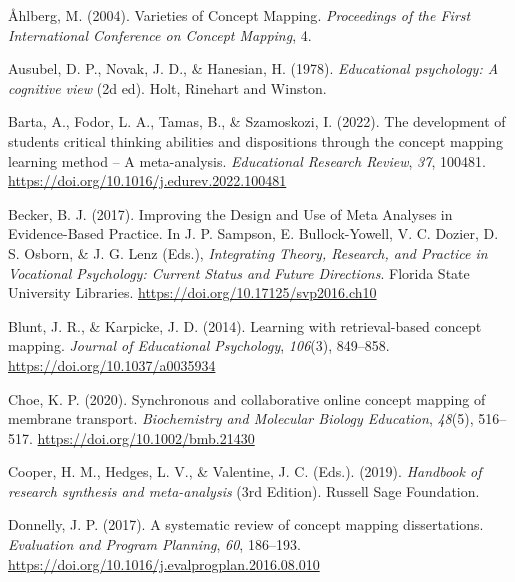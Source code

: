 \documentclass[
  letterpaper,
  DIV=11,
  numbers=noendperiod]{scrartcl}
\newlength{\cslhangindent}
\newlength{\cslentryspacingunit} %
\newenvironment{CSLReferences}[2] %
 {%
  \setlength{\parindent}{0pt}
  \ifodd #1
  \let\oldpar\par
  \def\par{\hangindent=\cslhangindent\oldpar}
  \fi
  \setlength{\parskip}{#2\cslentryspacingunit}
 }%
 {}
\begin{document}
\hypertarget{refs}{}
\begin{CSLReferences}{1}{0}
\leavevmode{}%
Åhlberg, M. (2004). Varieties of {Concept Mapping}. \emph{Proceedings of
the First International Conference on Concept Mapping}, 4.

\leavevmode{}%
Ausubel, D. P., Novak, J. D., \& Hanesian, H. (1978). \emph{Educational
psychology: A cognitive view} (2d ed). {Holt, Rinehart and Winston}.

\leavevmode{}%
Barta, A., Fodor, L. A., Tamas, B., \& Szamoskozi, I. (2022). The
development of students critical thinking abilities and dispositions
through the concept mapping learning method -- {A} meta-analysis.
\emph{Educational Research Review}, \emph{37}, 100481.
\url{https://doi.org/10.1016/j.edurev.2022.100481}

\leavevmode{}%
Becker, B. J. (2017). Improving the {Design} and {Use} of {Meta
Analyses} in {Evidence-Based Practice}. In J. P. Sampson, E.
Bullock-Yowell, V. C. Dozier, D. S. Osborn, \& J. G. Lenz (Eds.),
\emph{Integrating {Theory}, {Research}, and {Practice} in {Vocational
Psychology}: {Current Status} and {Future Directions}}. {Florida State
University Libraries}. \url{https://doi.org/10.17125/svp2016.ch10}

\leavevmode{}%
Blunt, J. R., \& Karpicke, J. D. (2014). Learning with retrieval-based
concept mapping. \emph{Journal of Educational Psychology},
\emph{106}(3), 849--858. \url{https://doi.org/10.1037/a0035934}

\leavevmode{}%
Choe, K. P. (2020). Synchronous and collaborative online concept mapping
of membrane transport. \emph{Biochemistry and Molecular Biology
Education}, \emph{48}(5), 516--517.
\url{https://doi.org/10.1002/bmb.21430}

\leavevmode{}%
Cooper, H. M., Hedges, L. V., \& Valentine, J. C. (Eds.). (2019).
\emph{Handbook of research synthesis and meta-analysis} (3rd Edition).
{Russell Sage Foundation}.

\leavevmode{}%
Donnelly, J. P. (2017). A systematic review of concept mapping
dissertations. \emph{Evaluation and Program Planning}, \emph{60},
186--193. \url{https://doi.org/10.1016/j.evalprogplan.2016.08.010}


\end{CSLReferences}
\end{document}
